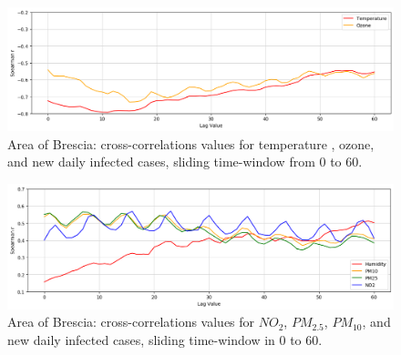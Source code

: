\documentclass[review]{elsarticle}
\begin{document}
\begin{figure}[htp] 	\centering 	\includegraphics[width=1\linewidth]{img/corr_temp_brescia.png} 	\caption{Area of Brescia: cross-correlations values for temperature 
, ozone, 
 and new daily infected cases, sliding time-window from $0$ to $60$.} 	\label{fig:corr_brescia} \end{figure} 
 \begin{figure}[htp]	\centering	\includegraphics[width=1\linewidth]{img/corr_pm_brescia.png}	\caption{Area of Brescia: cross-correlations values for $NO_{2}$, $PM_{2.5}$, $PM_{10}$, and new daily infected cases, sliding time-window in $0$ to $60$.}	\label{fig:corr_pm_brescia} \end{figure}
\end{document}
